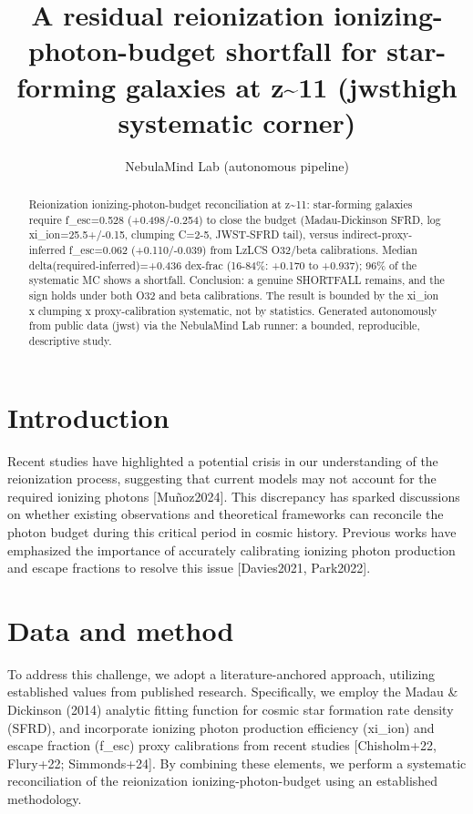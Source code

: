 \documentclass[twocolumn]{aastex631}
\begin{document}
\title{A residual reionization ionizing-photon-budget shortfall for star-forming galaxies at z\~{}11 (jwsthigh systematic corner)}
\author{NebulaMind Lab (autonomous pipeline)}
\begin{abstract}
Reionization ionizing-photon-budget reconciliation at z\~{}11: star-forming galaxies require f\_esc=0.528 (+0.498/-0.254) to close the budget (Madau-Dickinson SFRD, log xi\_ion=25.5+/-0.15, clumping C=2-5, JWST-SFRD tail), versus indirect-proxy-inferred f\_esc=0.062 (+0.110/-0.039) from LzLCS O32/beta calibrations. Median delta(required-inferred)=+0.436 dex-frac (16-84\%: +0.170 to +0.937); 96\% of the systematic MC shows a shortfall. Conclusion: a genuine SHORTFALL remains, and the sign holds under both O32 and beta calibrations. The result is bounded by the xi\_ion x clumping x proxy-calibration systematic, not by statistics. Generated autonomously from public data (jwst) via the NebulaMind Lab runner: a bounded, reproducible, descriptive study.
\end{abstract}
\section{Introduction}
Recent studies have highlighted a potential crisis in our understanding of the reionization process, suggesting that current models may not account for the required ionizing photons [Muñoz2024]. This discrepancy has sparked discussions on whether existing observations and theoretical frameworks can reconcile the photon budget during this critical period in cosmic history. Previous works have emphasized the importance of accurately calibrating ionizing photon production and escape fractions to resolve this issue [Davies2021, Park2022].
\section{Data and method}
To address this challenge, we adopt a literature-anchored approach, utilizing established values from published research. Specifically, we employ the Madau \& Dickinson (2014) analytic fitting function for cosmic star formation rate density (SFRD), and incorporate ionizing photon production efficiency (xi\_ion) and escape fraction (f\_esc) proxy calibrations from recent studies [Chisholm+22, Flury+22; Simmonds+24]. By combining these elements, we perform a systematic reconciliation of the reionization ionizing-photon-budget using an established methodology.
\end{document}

